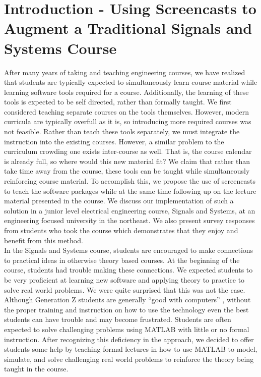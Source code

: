 \documentclass[a4paper,10pt]{article}
\begin{document}
\section{Introduction - Using Screencasts to Augment a Traditional Signals and Systems Course}
After many years of taking and teaching engineering courses, we have realized that students are typically expected to simultaneously learn course material while learning software tools required for a course. Additionally, the learning of these tools is expected to be self directed, rather than formally taught. We first considered teaching separate courses on the tools themselves. However, modern curricula are typically overfull as it is, so introducing more required courses was not feasible. Rather than teach these tools separately, we must integrate the instruction into the existing courses. However, a similar problem to the curriculum crowding one exists inter-course as well. That is, the course calendar is already full, so where would this new material fit? We claim that rather than take time away from the course, these tools can be taught while simultaneously reinforcing course material. To accomplish this, we propose the use of screencasts to teach the software packages while at the same time following up on the lecture material presented in the course. We discuss our implementation of such a solution in a junior level electrical engineering course, Signals and Systems, at an engineering focused university in the northeast. We also present survey responses from students who took the course which demonstrates that they enjoy and benefit from this method.
\\
In the Signals and Systems course, students are encouraged to make connections to practical ideas in otherwise theory based courses.  At the beginning of the course, students had trouble making these connections.  We expected students to be very proficient at learning new software and applying theory to practice to solve real world problems. We were quite surprised that this was not the case.  Although Generation Z students are generally ``good with computers'' \cite{GenerationZ}, without the proper training and instruction on how to use the technology even the best students can have trouble and may become frustrated. Students are often expected to solve challenging problems using MATLAB with little or no formal instruction.  After recognizing this deficiency in the approach, we decided to offer students some help by teaching formal lectures in how to use MATLAB to model, simulate, and solve challenging real world problems to reinforce the theory being taught in the course.  
\end{document}

